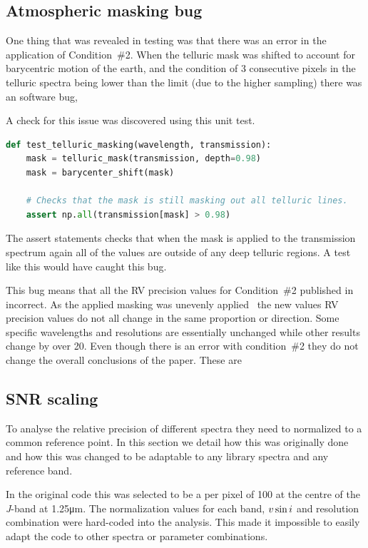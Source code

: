 \subsection{Atmospheric masking bug}
\label{subsec:condition_two_bug}
One thing that was revealed in testing was that there was an error in the application of Condition~\#2.
When the telluric mask was shifted to account for barycentric motion of the earth, and the condition of 3 consecutive pixels in the telluric spectra being lower than the limit (due to the higher sampling) there was an software bug,


A check for this issue was discovered using this unit test.
\begin{lstlisting}[language=Python, caption=Example unit test to catch masking bug.]
def test_telluric_masking(wavelength, transmission):
    mask = telluric_mask(transmission, depth=0.98)
    mask = barycenter_shift(mask)

    # Checks that the mask is still masking out all telluric lines.
    assert np.all(transmission[mask] > 0.98)
\end{lstlisting}
The assert statements checks that when the mask is applied to the transmission spectrum again all of the values are outside of any deep telluric regions.
A test like this would have caught this bug.

This bug means that all the {RV} precision values for Condition~\#2 published in~\citet{figueira_radial_2016} incorrect.
As the applied masking was unevenly applied~\citet{figueira_radial_2016} the new values {RV} precision values do not all change in the same proportion or direction.
Some specific wavelengths and resolutions are essentially unchanged while other results change by over 20\mps{}.  Even though there is an error with condition~\#2 they do not change the overall conclusions of the paper.
These are 

\subsection{SNR scaling}
\label{subsec:snr_scaling}
To analyse the relative precision of different spectra they need to normalized to a common reference point.
In this section we detail how this was originally done and how this was changed to be adaptable to any library spectra and any reference band.

In the original code this was selected to be a \snr{} per pixel of 100 at the centre of the \textit{J}-band at 1.25\si{\micro\meter}.
The normalization values for each band, \(v\sin{i}\) and resolution combination were hard-coded into the analysis.
This made it impossible to easily adapt the code to other spectra or parameter combinations.

